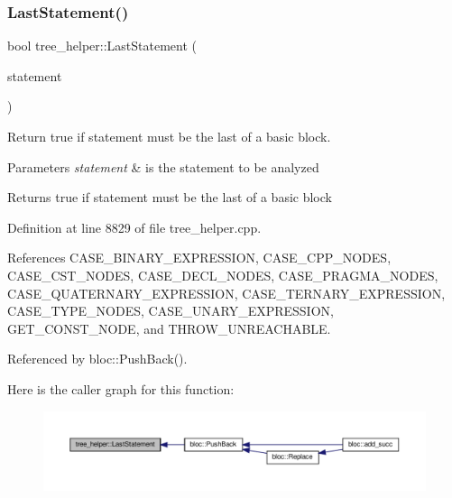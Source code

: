 \subsubsection{\texorpdfstring{Last\+Statement()}{LastStatement()}}
{\footnotesize\ttfamily bool tree\+\_\+helper\+::\+Last\+Statement (\begin{DoxyParamCaption}\item[{const \hyperlink{tree__node_8hpp_a3cf5d02292c940f3892425a5b5fdec3c}{tree\+\_\+node\+Const\+Ref} \&}]{statement }\end{DoxyParamCaption})\hspace{0.3cm}{\ttfamily [static]}}



Return true if statement must be the last of a basic block. 


\begin{DoxyParams}{Parameters}
{\em statement} & is the statement to be analyzed \\
\hline
\end{DoxyParams}
\begin{DoxyReturn}{Returns}
true if statement must be the last of a basic block 
\end{DoxyReturn}


Definition at line 8829 of file tree\+\_\+helper.\+cpp.



References C\+A\+S\+E\+\_\+\+B\+I\+N\+A\+R\+Y\+\_\+\+E\+X\+P\+R\+E\+S\+S\+I\+ON, C\+A\+S\+E\+\_\+\+C\+P\+P\+\_\+\+N\+O\+D\+ES, C\+A\+S\+E\+\_\+\+C\+S\+T\+\_\+\+N\+O\+D\+ES, C\+A\+S\+E\+\_\+\+D\+E\+C\+L\+\_\+\+N\+O\+D\+ES, C\+A\+S\+E\+\_\+\+P\+R\+A\+G\+M\+A\+\_\+\+N\+O\+D\+ES, C\+A\+S\+E\+\_\+\+Q\+U\+A\+T\+E\+R\+N\+A\+R\+Y\+\_\+\+E\+X\+P\+R\+E\+S\+S\+I\+ON, C\+A\+S\+E\+\_\+\+T\+E\+R\+N\+A\+R\+Y\+\_\+\+E\+X\+P\+R\+E\+S\+S\+I\+ON, C\+A\+S\+E\+\_\+\+T\+Y\+P\+E\+\_\+\+N\+O\+D\+ES, C\+A\+S\+E\+\_\+\+U\+N\+A\+R\+Y\+\_\+\+E\+X\+P\+R\+E\+S\+S\+I\+ON, G\+E\+T\+\_\+\+C\+O\+N\+S\+T\+\_\+\+N\+O\+DE, and T\+H\+R\+O\+W\+\_\+\+U\+N\+R\+E\+A\+C\+H\+A\+B\+LE.



Referenced by bloc\+::\+Push\+Back().

Here is the caller graph for this function\+:
\nopagebreak
\begin{figure}[H]
\begin{center}
\leavevmode
\includegraphics[width=350pt]{d7/d99/classtree__helper_aea2c2c5f7d79071fd7ae3f755aedb760_icgraph}
\end{center}
\end{figure}
\mbox{\label{classtree__helper_aab7b2a970899a09142e98fa196d57ec5}} 
